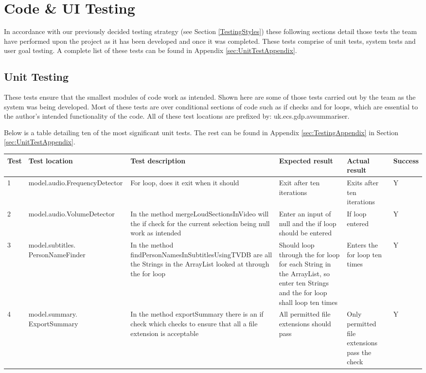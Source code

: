\newpage
\section{Code \& UI Testing}

In accordance with our previously decided testing strategy (see Section
\ref{TestingStyles}) these following sections detail those tests the team have
performed upon the project as it has been developed and once it was completed. These tests comprise of unit tests, system tests and user goal testing. A complete list of these tests can be found in Appendix \ref{sec:UnitTestAppendix}.

\subsection{Unit Testing}
These tests ensure that the smallest modules of code work as intended. Shown here
are some of those tests carried out by the team as the system was being developed. Most of these tests are over
conditional sections of code such as if checks and for loops, which are essential
to the author's intended functionality of the code. All of these test locations are prefixed by: uk.ecs.gdp.avsummariser. 

Below is a table detailing ten of the most significant unit tests. The rest can be found in Appendix \ref{sec:TestingAppendix} in Section \ref{sec:UnitTestAppendix}.

\begin{center}
\begin{tabular}{| p{18pt} | p{90pt}| p{78pt}| p{75pt} | p{62pt} | p{35pt} |}
\hline
Test & Test location & Test description & Expected result & Actual result & Success\\\hline
1 & model.audio.\newline FrequencyDetector & For loop, does it exit when it should & Exit after ten iterations & Exits after ten iterations & Y\\\hline
2 & model.audio.\newline VolumeDetector & In the method
mergeLoudSectionsInVideo will the if check for the current selection being null
work as intended & Enter an input of null and the if loop should be entered & If
loop entered & Y\\\hline
3 & model.subtitles. \newline PersonNameFinder & In the method
findPersonNamesInSubtitlesUsingTVDB are all the Strings in the ArrayList looked
at through the for loop & Should loop through the for loop for each String in
the ArrayList, so enter ten Strings and the for loop shall loop ten times &
Enters the for loop ten times & Y\\ \hline
4 & model.summary. \newline ExportSummary & In the method exportSummary there
is an if check which checks to ensure that all a file extension is acceptable & All
permitted file extensions should pass & Only permitted file extensions pass the
check & Y\\ \hline
\end{tabular}
\end{center}

